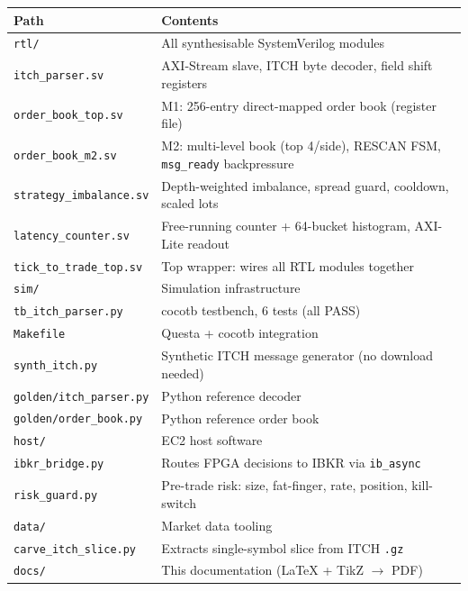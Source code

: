 \documentclass[11pt,a4paper]{article}
\begin{document}
\begin{center}
\small
\begin{tabular}{>{\ttfamily}l l}
\toprule
\textbf{Path} & \textbf{Contents} \\
\midrule
\texttt{rtl/}         & All synthesisable SystemVerilog modules \\
\quad\texttt{itch\_parser.sv}        & AXI-Stream slave, ITCH byte decoder, field shift registers \\
\quad\texttt{order\_book\_top.sv}    & M1: 256-entry direct-mapped order book (register file) \\
\quad\texttt{order\_book\_m2.sv}     & M2: multi-level book (top 4/side), RESCAN FSM, \texttt{msg\_ready} backpressure \\
\quad\texttt{strategy\_imbalance.sv} & Depth-weighted imbalance, spread guard, cooldown, scaled lots \\
\quad\texttt{latency\_counter.sv}    & Free-running counter + 64-bucket histogram, AXI-Lite readout \\
\quad\texttt{tick\_to\_trade\_top.sv}& Top wrapper: wires all RTL modules together \\
\midrule
\texttt{sim/}         & Simulation infrastructure \\
\quad\texttt{tb\_itch\_parser.py}    & cocotb testbench, 6 tests (all PASS) \\
\quad\texttt{Makefile}               & Questa + cocotb integration \\
\quad\texttt{synth\_itch.py}         & Synthetic ITCH message generator (no download needed) \\
\quad\texttt{golden/itch\_parser.py} & Python reference decoder \\
\quad\texttt{golden/order\_book.py}  & Python reference order book \\
\midrule
\texttt{host/}        & EC2 host software \\
\quad\texttt{ibkr\_bridge.py}        & Routes FPGA decisions to IBKR via \texttt{ib\_async} \\
\quad\texttt{risk\_guard.py}         & Pre-trade risk: size, fat-finger, rate, position, kill-switch \\
\midrule
\texttt{data/}        & Market data tooling \\
\quad\texttt{carve\_itch\_slice.py}  & Extracts single-symbol slice from ITCH \texttt{.gz} \\
\midrule
\texttt{docs/}        & This documentation (LaTeX + TikZ $\rightarrow$ PDF) \\
\bottomrule
\end{tabular}
\end{center}
\end{document}
